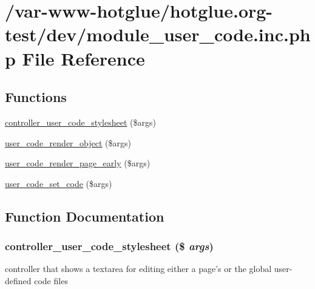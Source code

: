 \hypertarget{module__user__code_8inc_8php}{
\section{/var-\/www-\/hotglue/hotglue.org-\/test/dev/module\_\-user\_\-code.inc.php File Reference}
\label{module__user__code_8inc_8php}
}
\subsection*{Functions}
\begin{DoxyCompactItemize}
\item 
\hyperlink{module__user__code_8inc_8php_ada93b4078c8aa85c4b2bd3709501922b}{controller\_\-user\_\-code\_\-stylesheet} (\$args)
\item 
\hyperlink{module__user__code_8inc_8php_ae2a601394f96c69bb105d73774d2aa29}{user\_\-code\_\-render\_\-object} (\$args)
\item 
\hyperlink{module__user__code_8inc_8php_ac616caa2e8476e976c51e8b833e6d55b}{user\_\-code\_\-render\_\-page\_\-early} (\$args)
\item 
\hyperlink{module__user__code_8inc_8php_a788372f1e959532d09dceb63209507cb}{user\_\-code\_\-set\_\-code} (\$args)
\end{DoxyCompactItemize}


\subsection{Function Documentation}
\hypertarget{module__user__code_8inc_8php_ada93b4078c8aa85c4b2bd3709501922b}{
\subsubsection[{controller\_\-user\_\-code\_\-stylesheet}]{\setlength{\rightskip}{0pt plus 5cm}controller\_\-user\_\-code\_\-stylesheet (\$ {\em args})}}
\label{module__user__code_8inc_8php_ada93b4078c8aa85c4b2bd3709501922b}
controller that shows a textarea for editing either a page's or the global user-\/defined code files 

